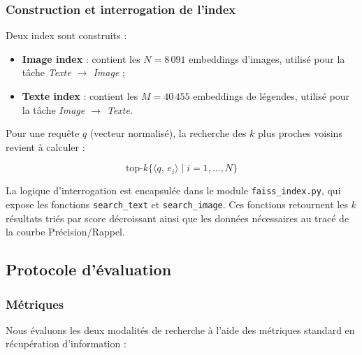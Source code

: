 \documentclass[a4paper,11pt]{article}
\begin{document}
\subsubsection{Construction et interrogation de l'index}
 
Deux index sont construits :
 
\begin{itemize}
    \item \textbf{Image index} : contient les $N = 8\,091$ embeddings d'images,
          utilisé pour la tâche \textit{Texte $\rightarrow$ Image} ;
    \item \textbf{Texte index} : contient les $M = 40\,455$ embeddings de légendes,
          utilisé pour la tâche \textit{Image $\rightarrow$ Texte}.
\end{itemize}
 
Pour une requête $q$ (vecteur normalisé), la recherche des $k$ plus proches voisins
revient à calculer :
 
\begin{equation}
    \text{top-}k\bigl\{\langle q,\, e_i \rangle \mid i = 1, \ldots, N\bigr\}
\end{equation}
 
La logique d'interrogation est encapsulée dans le module \texttt{faiss\_index.py},
qui expose les fonctions \texttt{search\_text} et \texttt{search\_image}.
Ces fonctions retournent les $k$ résultats triés par score décroissant
ainsi que les données nécessaires au tracé de la courbe
Précision/Rappel.
 
\subsection{Protocole d'évaluation}
 
\subsubsection{Métriques}
 
Nous évaluons les deux modalités de recherche à l'aide des métriques
standard en récupération d'information :
 
\end{document}
